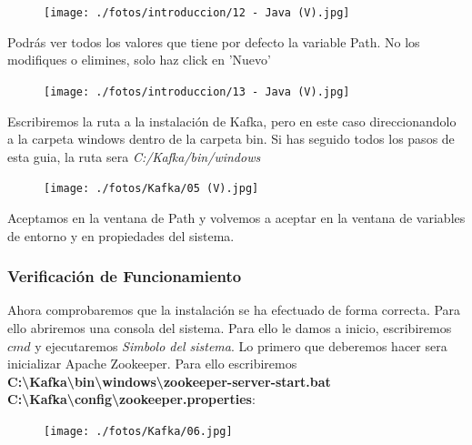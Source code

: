 \documentclass[a4paper,10pt]{article}
\begin{document}
\begin{figure}[H]
\begin{center}
\texttt{[image: ./fotos/introduccion/12 - Java (V).jpg]}
\end{center}
\end{figure}

Podrás ver todos los valores que tiene por defecto la variable Path. No los modifiques o elimines, solo haz click en 'Nuevo' 

\begin{figure}[H]
\begin{center}
\texttt{[image: ./fotos/introduccion/13 - Java (V).jpg]}
\end{center}
\end{figure}

Escribiremos la ruta a la instalación de Kafka, pero en este caso direccionandolo a la carpeta windows dentro de la carpeta bin. Si has seguido todos los pasos de esta guia, la ruta sera \textit{C:/Kafka/bin/windows}

\begin{figure}[H]
\begin{center}
\texttt{[image: ./fotos/Kafka/05 (V).jpg]}
\end{center}
\end{figure}

Aceptamos en la ventana de Path y volvemos a aceptar en la ventana de variables de entorno y en propiedades del sistema.

\clearpage

\subsubsection{Verificación de Funcionamiento}

Ahora comprobaremos que la instalación se ha efectuado de forma correcta. Para ello abriremos una consola del sistema. Para ello le damos a inicio, escribiremos $\textit{cmd}$ y ejecutaremos \textit{Simbolo del sistema}. Lo primero que deberemos hacer sera inicializar Apache Zookeeper. Para ello escribiremos \textbf{C:\textbackslash Kafka\textbackslash bin\textbackslash windows\textbackslash zookeeper-server-start.bat C:\textbackslash Kafka\textbackslash config\textbackslash zookeeper.properties}:

\begin{figure}[H]
\begin{center}
\texttt{[image: ./fotos/Kafka/06.jpg]}
\end{center}
\end{figure}
\end{document}
